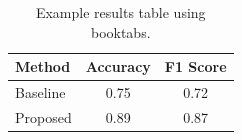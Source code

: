 

\begin{table}[ht]
    \centering
    \caption{Example results table using booktabs.}
    \label{tab:example}
    \begin{tabular}{lcc}
        \toprule
        Method & Accuracy & F1 Score \\
        \midrule
        Baseline & 0.75 & 0.72 \\
        Proposed & 0.89 & 0.87 \\
        \bottomrule
    \end{tabular}
\end{table}
